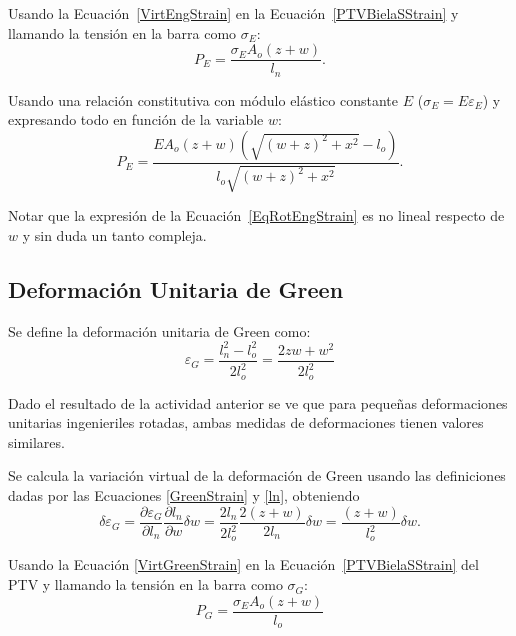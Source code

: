 Usando la Ecuación~\eqref{VirtEngStrain} en la Ecuación~\eqref{PTVBielaSStrain} y llamando la tensión en la barra como $\sigma_E$:
%
\begin{equation}
P_E = \frac{\sigma_EA_o(z+w)}{l_n}.
\end{equation}

Usando una relación constitutiva con módulo elástico constante $E$ ($\sigma_E = E \varepsilon_E$) y expresando todo en función de la variable $w$:
%
\begin{equation}\label{EqRotEngStrain}
P_E = \frac{EA_o(z+w)\left(\sqrt{(w+z)^2+x^2}-l_o\right)}{l_o\sqrt{(w+z)^2+x^2}}.
\end{equation}

Notar que la expresión de la Ecuación~\eqref{EqRotEngStrain} es no lineal respecto de $w$ y sin duda un tanto compleja.

\subsection{Deformación Unitaria de Green}

Se define la deformación unitaria de Green como:
%
\begin{equation}\label{GreenStrain}
\varepsilon_G = \frac{l_n^2 - l_o^2}{2l_o^2} = \frac{2zw+w^2}{2l_o^2}
\end{equation}


Dado el resultado de la actividad anterior se ve que para pequeñas deformaciones unitarias ingenieriles rotadas, ambas medidas de deformaciones tienen valores similares.

Se calcula la variación virtual de la deformación de Green usando las definiciones dadas por las Ecuaciones \eqref{GreenStrain} y \eqref{ln}, obteniendo
%
\begin{equation}\label{VirtGreenStrain}
\delta \varepsilon_G = \frac{\partial \varepsilon_G}{\partial l_n}\frac{\partial l_n}{\partial w}\delta w =	\frac{2l_n}{2l_o^2}\frac{2(z+w)}{2l_n}\delta w = \frac{(z+w)}{l_o^2}\delta w.
\end{equation}

Usando la Ecuación \eqref{VirtGreenStrain} en la Ecuación~\eqref{PTVBielaSStrain} del PTV y llamando la tensión en la barra como $\sigma_G$:
%
\begin{equation}
P_G = \frac{\sigma_EA_o(z+w)}{l_o}
\end{equation}

